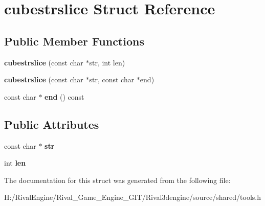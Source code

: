 \hypertarget{structcubestrslice}{}\section{cubestrslice Struct Reference}
\label{structcubestrslice}
\subsection*{Public Member Functions}
\begin{DoxyCompactItemize}
\item 
\mbox{\label{structcubestrslice_a52bcebc99828d7f99f3f91e6df61046f}} 
{\bfseries cubestrslice} (const char $\ast$str, int len)
\item 
\mbox{\label{structcubestrslice_ad2c87f6e8dd85aaa2922545aecb464d0}} 
{\bfseries cubestrslice} (const char $\ast$str, const char $\ast$end)
\item 
\mbox{\label{structcubestrslice_af46806244a67beaf4c2db22d6bf95579}} 
const char $\ast$ {\bfseries end} () const
\end{DoxyCompactItemize}
\subsection*{Public Attributes}
\begin{DoxyCompactItemize}
\item 
\mbox{\label{structcubestrslice_a952931deddd549192b50600c7c6d097e}} 
const char $\ast$ {\bfseries str}
\item 
\mbox{\label{structcubestrslice_a0ab270f70c1d74ec5377cc9329b66a7d}} 
int {\bfseries len}
\end{DoxyCompactItemize}


The documentation for this struct was generated from the following file\+:\begin{DoxyCompactItemize}
\item 
H\+:/\+Rival\+Engine/\+Rival\+\_\+\+Game\+\_\+\+Engine\+\_\+\+G\+I\+T/\+Rival3dengine/source/shared/tools.\+h\end{DoxyCompactItemize}
